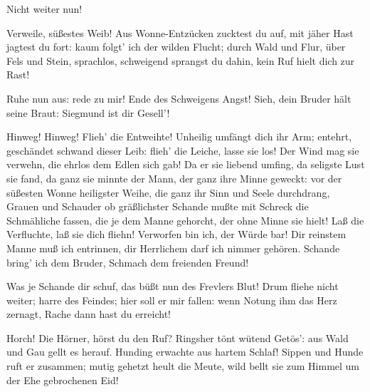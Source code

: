 \begin{drama}
\Siegmundspeaks


Nicht weiter nun!
 



Verweile, süßestes Weib!
Aus Wonne-Entzücken zucktest du auf,
mit jäher Hast jagtest du fort:
kaum folgt' ich der wilden Flucht;
durch Wald und Flur, über Fels und Stein,
sprachlos, schweigend sprangst du dahin,
kein Ruf hielt dich zur Rast!
 

Ruhe nun aus: rede zu mir!
Ende des Schweigens Angst!
Sieh, dein Bruder hält seine Braut:
Siegmund ist dir Gesell'!
 




\Sieglindespeaks


Hinweg! Hinweg! Flieh' die Entweihte!
Unheilig umfängt dich ihr Arm;
entehrt, geschändet schwand dieser Leib:
flieh' die Leiche, lasse sie los!
Der Wind mag sie verwehn,
die ehrlos dem Edlen sich gab!
Da er sie liebend umfing,
da seligste Lust sie fand,
da ganz sie minnte der Mann,
der ganz ihre Minne geweckt:
vor der süßesten Wonne heiligster Weihe,
die ganz ihr Sinn und Seele durchdrang,
Grauen und Schauder ob gräßlichster Schande
mußte mit Schreck die Schmähliche fassen,
die je dem Manne gehorcht,
der ohne Minne sie hielt!
Laß die Verfluchte, laß sie dich fliehn!
Verworfen bin ich, der Würde bar!
Dir reinstem Manne muß ich entrinnen,
dir Herrlichem darf ich nimmer gehören.
Schande bring' ich dem Bruder,
Schmach dem freienden Freund!
 

\Siegmundspeaks
Was je Schande dir schuf,
das büßt nun des Frevlers Blut!
Drum fliehe nicht weiter; harre des Feindes;
hier soll er mir fallen:
wenn Notung ihm das Herz zernagt,
Rache dann hast du erreicht!
 

\Sieglindespeaks


Horch! Die Hörner, hörst du den Ruf?
Ringsher tönt wütend Getös':
aus Wald und Gau gellt es herauf.
Hunding erwachte aus hartem Schlaf!
Sippen und Hunde ruft er zusammen;
mutig gehetzt heult die Meute,
wild bellt sie zum Himmel
um der Ehe gebrochenen Eid!
 



\end{drama}
